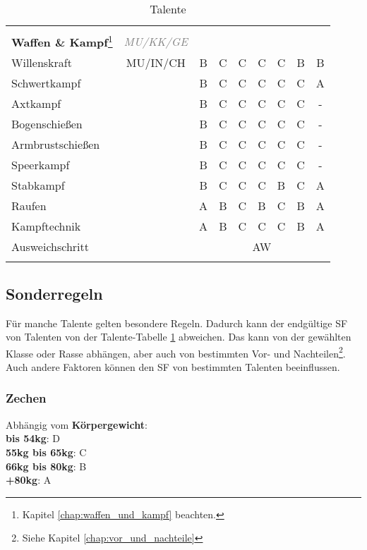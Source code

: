 \begin{center}
\begin{longtable}{|l|c|c|c|c|c|c|c|c|}
\hline
\multicolumn{9}{|l|}{} \\
\multicolumn{1}{|l}{\textbf{Waffen \& Kampf}\footnote{Kapitel \ref{chap:waffen_und_kampf} beachten.}} & \multicolumn{1}{c}{\textcolor{gray}{\textit{MU/KK/GE}}} & \multicolumn{7}{r|}{} \\
\hline
Willenskraft\footnotemark[3] & MU/IN/CH & B & C & C & C & C & B & B \\
\hline
Schwertkampf & & B & C & C & C & C & C & A \\
\hline
Axtkampf & & B & C & C & C & C & C & - \\
\hline
Bogenschießen & & B & C & C & C & C & C & - \\
\hline
Armbrustschießen & & B & C & C & C & C & C & - \\
\hline
Speerkampf & & B & C & C & C & C & C & - \\
\hline
Stabkampf\footnotemark[3] & & B & C & C & C & B & C & A \\
\hline
Raufen\footnotemark[3] & & A & B & C & B & C & B & A \\
\hline
Kampftechnik\footnotemark[3] & & A & B & C & C & C & B & A \\
\hline
Ausweichschritt\footnotemark[3] & & \multicolumn{7}{c|}{AW} \\

\hline
\caption{Talente}
\label{tab:Talente}
\end{longtable}
\end{center}

\subsection{Sonderregeln}
\label{chap:sonderregeln}
Für manche Talente gelten besondere Regeln. Dadurch kann der endgültige SF von Talenten von der Talente-Tabelle \ref{tab:Talente} abweichen. Das kann von der gewählten Klasse oder Rasse abhängen, aber auch von bestimmten Vor- und Nachteilen\footnote{Siehe Kapitel \ref{chap:vor_und_nachteile}}. Auch andere Faktoren können den SF von bestimmten Talenten beeinflussen.

\subsubsection{Zechen}
Abhängig vom \textbf{Körpergewicht}: \\
\textbf{bis 54kg}: D \\
\textbf{55kg bis 65kg}: C \\
\textbf{66kg bis 80kg}: B \\
\textbf{+80kg}: A

